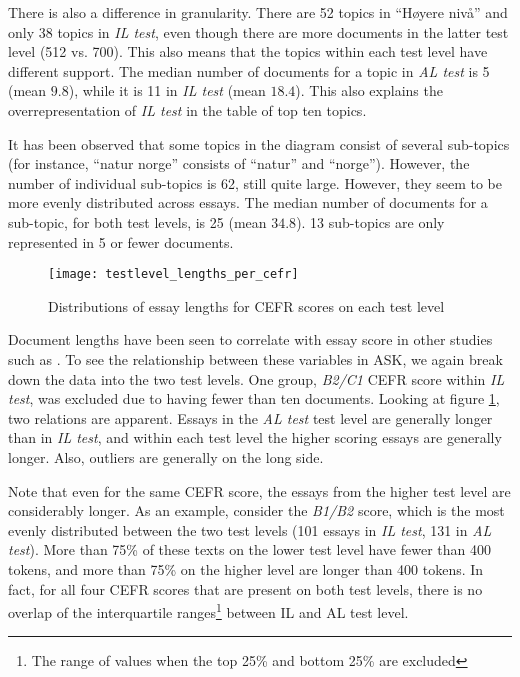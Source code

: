 There is also a difference in granularity. There are 52 topics in ``Høyere
nivå'' and only 38 topics in \emph{IL test}, even though there are more
documents in the latter test level (512 vs. 700). This also means that the
topics within each test level have different support. The median number of
documents for a topic in \emph{AL test} is 5 (mean $9.8$), while it is 11 in
\emph{IL test} (mean $18.4$). This also explains the overrepresentation of
\emph{IL test} in the table of top ten topics.

It has been observed that some topics in the diagram consist of several
sub-topics (for instance, ``natur norge'' consists of ``natur'' and
``norge''). However, the number of individual sub-topics is 62, still quite
large. However, they seem to be more evenly distributed across essays. The
median number of documents for a sub-topic, for both test levels, is 25 (mean
$34.8$). 13 sub-topics are only represented in 5 or fewer documents.

\begin{figure}
  \centering
  \texttt{[image: testlevel\_lengths\_per\_cefr]}
  \caption{Distributions of essay lengths for CEFR scores on each test level}
  \label{fig:testlevel-lengths-per-cefr}
\end{figure}

Document lengths have been seen to correlate with essay score in other
studies such as \textcite{vajjala17}. To see the relationship between these
variables in ASK, we again break down the data into the two test levels. One
group, \emph{B2/C1} CEFR score within \emph{IL test}, was excluded due to
having fewer than ten documents. Looking at figure
\ref{fig:testlevel-lengths-per-cefr}, two relations are apparent. Essays in the
\emph{AL test} test level are generally longer than in \emph{IL test}, and
within each test level the higher scoring essays are generally longer.
Also, outliers are generally on the long side.

Note that even for the same CEFR score, the essays from the higher test level
are considerably longer. As an example, consider the \emph{B1/B2} score,
which is the most evenly distributed between the two test levels (101 essays
in \emph{IL test}, 131 in \emph{AL test}). More than 75\% of these texts on
the lower test level have fewer than 400 tokens, and more than 75\% on the
higher level are longer than 400 tokens. In fact, for all four CEFR scores
that are present on both test levels, there is no overlap of the
interquartile ranges\footnote{The range of values when the top 25\% and
bottom 25\% are excluded} between IL and AL test level.


